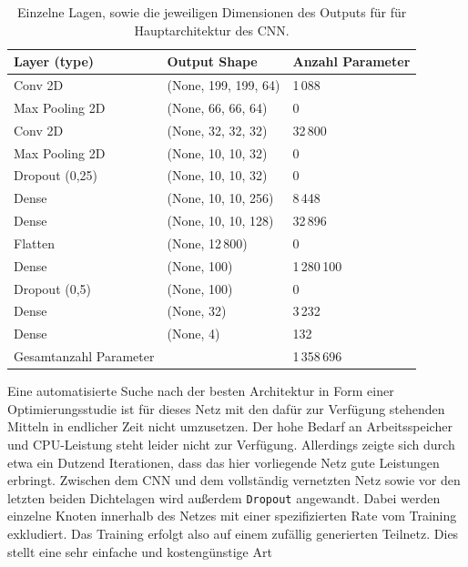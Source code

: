 \begin{table}[htb]
  \centering%
  \begin{tabular}{l
                  l
                  l}
      \toprule
      Layer (type)    & Output Shape     & Anzahl Parameter      \\
      \midrule
      Conv 2D         & (None, 199, 199, 64)  & 1\,088 \\
      Max Pooling 2D  & (None, 66, 66, 64)    & 0 \\
      Conv 2D         & (None, 32, 32, 32)    & 32\,800 \\
      Max Pooling 2D  & (None, 10, 10, 32)    & 0 \\
      Dropout (0,25)  & (None, 10, 10, 32)    & 0 \\
      Dense           & (None, 10, 10, 256)   & 8\,448 \\
      Dense           & (None, 10, 10, 128)   & 32\,896 \\
      Flatten         & (None, 12\,800)         & 0 \\
      Dense           & (None, 100)           & 1\,280\,100 \\
      Dropout (0,5)   & (None, 100)           & 0 \\
      Dense           & (None, 32)            & 3\,232 \\
      Dense           & (None, 4)             & 132 \\
      \midrule
      Gesamtanzahl Parameter &                & 1\,358\,696 \\
      \bottomrule
  \end{tabular}
  \caption{Einzelne Lagen, sowie die jeweiligen Dimensionen des Outputs für für Hauptarchitektur des CNN.}
  \label{tab:haupt}
\end{table}
\renewcommand{\baselinestretch}{1.5}
%
Eine automatisierte Suche nach der besten Architektur in Form einer
Optimierungsstudie ist für dieses Netz mit den dafür zur Verfügung stehenden
Mitteln in endlicher Zeit nicht umzusetzen. Der hohe Bedarf an Arbeitsspeicher
und CPU-Leistung steht leider nicht zur Verfügung. Allerdings zeigte sich durch
etwa ein Dutzend Iterationen, dass das hier vorliegende Netz gute Leistungen
erbringt. Zwischen dem CNN und dem vollständig vernetzten Netz sowie vor
den letzten beiden Dichtelagen wird außerdem \texttt{Dropout} angewandt.
Dabei werden einzelne Knoten innerhalb des Netzes mit einer spezifizierten Rate
vom Training exkludiert. Das Training erfolgt also auf einem zufällig
generierten Teilnetz. Dies stellt eine sehr einfache und kostengünstige Art
